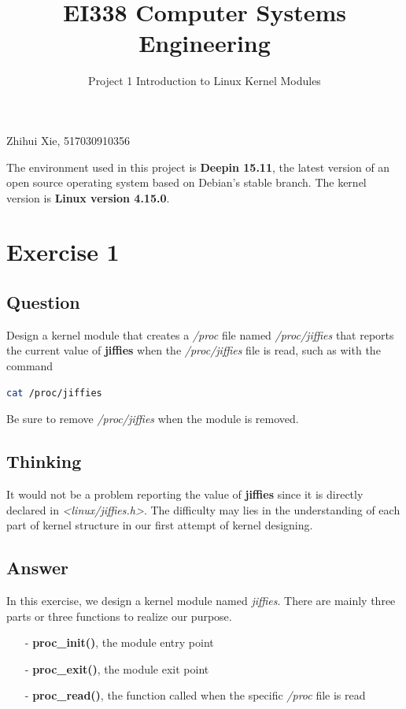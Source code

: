 \documentclass{article}
\title{EI338 Computer Systems Engineering}
\author{Project 1 Introduction to Linux Kernel Modules}
\begin{document}
\maketitle

\begin{center}
    Zhihui Xie, 517030910356
\end{center}

The environment used in this project is \textbf{Deepin 15.11}, the latest version of an open source operating system based on Debian's stable branch. The kernel version is \textbf{Linux version 4.15.0}.

\section*{Exercise 1}
    \subsection*{Question}
    Design a kernel module that creates a \textit{/proc} file named \textit{/proc/jiffies}
    that reports the current value of \textbf{jiffies} when the \textit{/proc/jiffies} file
    is read, such as with the command

    \vspace{2pt}

    \begin{lstlisting}[language=bash]
cat /proc/jiffies
    \end{lstlisting}

    \vspace{2pt}

    Be sure to remove \textit{/proc/jiffies} when the module is removed.
        
    \subsection*{Thinking} It would not be a problem reporting the value of \textbf{jiffies} since it is directly declared in \textit{<linux/jiffies.h>}. The difficulty may lies in the understanding of each part of kernel structure in our first attempt of kernel designing. 
    
    \subsection*{Answer} In this exercise, we design a kernel module named \textit{jiffies}. There are mainly three parts or three functions to realize our purpose.
    \begin{enumerate}
        \item[-] \textbf{proc\_init()}, the module entry point 
        \item[-] \textbf{proc\_exit()}, the module exit point
        \item[-] \textbf{proc\_read()}, the function called when the specific \textit{/proc} file is read  
    \end{enumerate}
\end{document}
